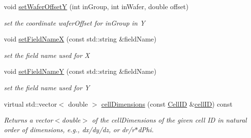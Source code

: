 \begin{DoxyCompactItemize}
void \hyperlink{class_d_d4hep_1_1_d_d_segmentation_1_1_wafer_grid_x_y_acb1ddfacb3dd3702f7e7102cc29d3930}{set\+Wafer\+OffsetY} (int in\+Group, int in\+Wafer, double offset)
\begin{DoxyCompactList}\small\item\em set the coordinate wafer\+Offset for in\+Group in Y \end{DoxyCompactList}\item 
void \hyperlink{class_d_d4hep_1_1_d_d_segmentation_1_1_wafer_grid_x_y_a4306fcd58177d9f24abd274a944eca6f}{set\+Field\+NameX} (const std\+::string \&field\+Name)
\begin{DoxyCompactList}\small\item\em set the field name used for X \end{DoxyCompactList}\item 
void \hyperlink{class_d_d4hep_1_1_d_d_segmentation_1_1_wafer_grid_x_y_a7ec7eba050ae07e10694ff0666a10d35}{set\+Field\+NameY} (const std\+::string \&field\+Name)
\begin{DoxyCompactList}\small\item\em set the field name used for Y \end{DoxyCompactList}\item 
virtual std\+::vector$<$ double $>$ \hyperlink{class_d_d4hep_1_1_d_d_segmentation_1_1_wafer_grid_x_y_a0f578347fbddd8cc394d4663f3f6176c}{cell\+Dimensions} (const \hyperlink{namespace_d_d4hep_1_1_d_d_segmentation_ac7af071d85cb48820914434a07e21ba1}{Cell\+ID} \&\hyperlink{class_d_d4hep_1_1_d_d_segmentation_1_1_wafer_grid_x_y_a5218281846eb9567e526cbaaeab85440}{cell\+ID}) const
\begin{DoxyCompactList}\small\item\em Returns a vector$<$double$>$ of the cell\+Dimensions of the given cell ID in natural order of dimensions, e.\+g., dx/dy/dz, or dr/r$\ast$d\+Phi. \end{DoxyCompactList}\end{DoxyCompactItemize}
